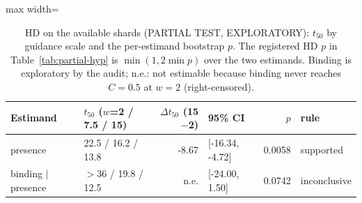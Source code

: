\begin{table}[t]\centering\small
\caption{HD on the available shards (PARTIAL TEST, EXPLORATORY): $t_{50}$ by guidance scale and the per-estimand bootstrap $p$. The registered HD $p$ in Table~\ref{tab:partial-hyp} is $\min(1, 2\min p)$ over the two estimands. Binding is exploratory by the audit; n.e.: not estimable because binding never reaches $C=0.5$ at $w=2$ (right-censored).}\label{tab:partial-hd}
\begin{adjustbox}{max width=\linewidth}
\begin{tabular}{llrlrl}
\toprule
Estimand & $t_{50}$ ($w$=2 / 7.5 / 15) & $\Delta t_{50}$ (15$-$2) & 95\% CI & $p$ & rule \\
\midrule
presence & 22.5 / 16.2 / 13.8 & -8.67 & [-16.34, -4.72] & 0.0058 & supported \\
binding $\mid$ presence & $>36$ / 19.8 / 12.5 & n.e. & [-24.00, 1.50] & 0.0742 & inconclusive \\
\bottomrule
\end{tabular}
\end{adjustbox}
\end{table}
